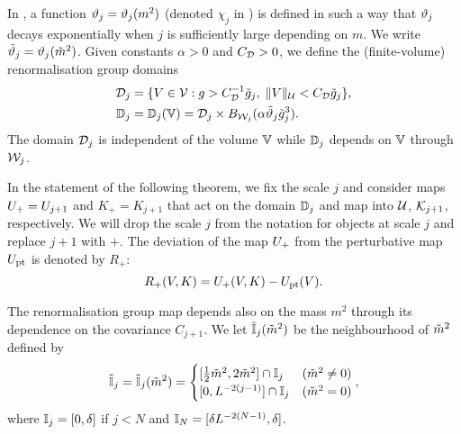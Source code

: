 In \cite[\eqref{log-e:mass-scale}--\eqref{log-e:chidef}]{BBS-saw4-log},
a function $\vartheta_j = \vartheta_j(m^2)$ (denoted $\chi_j$ in \cite{BBS-saw4-log})
is defined in such a way that $\vartheta_j$ decays exponentially
when $j$ is sufficiently large depending on $m$. We write $\tilde{\vartheta}_j = \vartheta_j(\tilde{m}^2)$.
Given constants $\alpha > 0$ and $C_{\mathcal{D}} > 0$, we define the (finite-volume)
renormalisation group domains
\begin{align}
\label{e:DVdef}
\mathcal{D}_j
	&=
\{ V\in \mathcal{V} :
	g > C_{\mathcal{D}}^{-1} \tilde{g}_j, \; \|V\|_{\mathcal{U}} < C_{\mathcal{D}} \tilde{g}_j \}, \\
\label{e:domRG}
\mathbb{D}_j
	&= \mathbb{D}_j(\mathbb{V})
	= \mathcal{D}_j \times B_{\mathcal{W}_j}(\alpha \tilde{\vartheta}_j \tilde{g}_j^3).
\end{align}
The domain $\mathcal{D}_j$ is independent of the volume $\mathbb{V}$ while $\mathbb{D}_j$
depends on $\mathbb{V}$ through $\mathcal{W}_j$.

In the statement of the following theorem, we fix the scale $j$ and
consider maps $U_+ = U_{j+1}$ and $K_+ = K_{j+1}$ that act on the domain
$\mathbb{D}_j$ and map into $\mathcal{U}$, $\mathcal{K}_{j+1}$, respectively.
We will drop the scale $j$ from the notation for objects at scale $j$
and replace $j + 1$ with $+$.
The deviation of the map $U_+$ from the perturbative map $U_{\rm pt}$
is denoted by $R_+$:
\begin{equation}
\label{e:Rplusdef}
    R_+(V,K) = U_+(V,K) -U_{\rm pt}(V).
\end{equation}

The renormalisation group map depends also on the mass $m^2$ through its
dependence on the covariance $C_{j+1}$.
We let $\tilde{\mathbb{I}}_j(\tilde{m}^2)$ be the neighbourhood of $\tilde{m}^2$ defined by
\begin{equation}
\lbeq{Itilint}
    \Igen_j = \Igen_j(\mgen^2) =
    \begin{cases}
    [\frac 12 \mgen^2, 2 \mgen^2] \cap \Iint_j & (\mgen^2 \neq 0)
    \\
    [0,L^{-2(j-1)}] \cap \Iint_j & (\mgen^2 =0)
    \end{cases},
\end{equation}
where $\mathbb{I}_j = [0, \delta]$ if $j < N$ and $\mathbb{I}_N = [\delta L^{-2 (N - 1)}, \delta]$.

